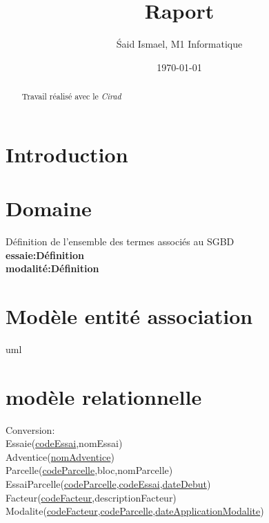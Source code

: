 \documentclass{article}
\title{Raport}
\author{\'Said Ismael, M1 Informatique}
\date{\today}
\begin{document}
\maketitle %


\begin{abstract}
  Travail réalisé avec le \textit{Cirad}~\cite{coursera}
\end{abstract}


\section{Introduction}
\section{Domaine}
Définition de l'ensemble des termes associés au SGBD \\ 
\textbf{essaie:Définition}
\\\textbf{modalité:Définition}
\section{Modèle entité association}
uml 

\section{modèle relationnelle}
Conversion:\\
Essaie(\underline{codeEssai},nomEssai)\\
Adventice(\underline{nomAdventice}) \\
Parcelle(\underline{codeParcelle},bloc,nomParcelle)\\
EssaiParcelle(\underline{codeParcelle},\underline{codeEssai},\underline{dateDebut})\\
Facteur(\underline{codeFacteur},descriptionFacteur)\\
Modalite(\underline{codeFacteur},\underline{codeParcelle},\underline{dateApplicationModalite})\\






\end{document}
